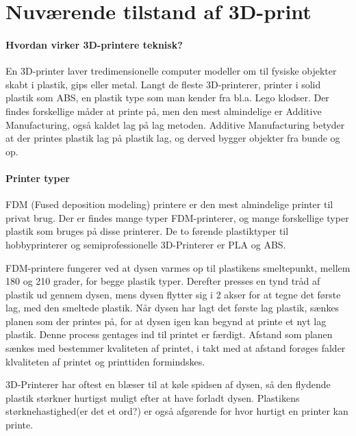 \chapter{Nuværende tilstand af 3D-print} %
\label{cha:nuv_rende_tilstand_af_3d_print}

\subsubsection{Hvordan virker 3D-printere teknisk?}
			
En 3D-printer laver tredimensionelle computer modeller om til fysiske objekter skabt i plastik, gips eller metal. Langt de fleste 3D-printerer, printer i solid plastik som ABS, en plastik type som man kender fra bl.a. Lego klodser. Der findes forskellige måder at printe på, men den mest almindelige er Additive Manufacturing, også kaldet lag på lag metoden. Additive Manufacturing betyder at der printes plastik lag på plastik lag, og derved bygger objekter fra bunde og op. 

\subsubsection{Printer typer}
FDM (Fused deposition modeling) printere er den mest almindelige printer til privat brug. Der er findes mange typer FDM-printerer, og mange forskellige typer plastik som bruges på disse printerer. De to førende plastiktyper til hobbyprinterer og semiprofessionelle 3D-Printerer er PLA og ABS. 


FDM-printere fungerer ved at dysen varmes op til plastikens smeltepunkt, mellem 180 og 210 grader, for begge plastik typer. Derefter presses en tynd tråd af plastik ud gennem dysen, mens dysen flytter sig i 2 akser for at tegne det første lag, med den smeltede plastik. 
Når dysen har lagt det første lag plastik, sænkes planen som der printes på, for at dysen igen kan begynd at printe et nyt lag plastik. Denne process gentages ind til printet er færdigt. 
Afstand som planen sænkes med bestemmer kvaliteten af printet, i takt med at afstand forøges falder klvaliteten af printet og printtiden formindskes.

3D-Printerer har oftest en blæser til at køle spidsen af dysen, så den flydende plastik størkner hurtigst muligt efter at have forladt dysen. Plastikens størknehastighed(er det et ord?) er også afgørende for hvor hurtigt en printer kan printe. 

